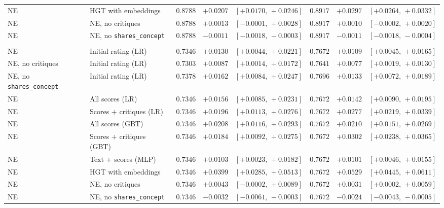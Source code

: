 \begin{table}[t]
\begin{tabular}{@{}llrrrrrr@{}}
NE & HGT with embeddings & $0.8788$ & $+0.0207$ & $[+0.0170,\,+0.0246]$ & $0.8917$ & $+0.0297$ & $[+0.0264,\,+0.0332]$ \\
NE & NE, no critiques & $0.8788$ & $+0.0013$ & $[-0.0001,\,+0.0028]$ & $0.8917$ & $+0.0010$ & $[-0.0002,\,+0.0020]$ \\
NE & NE, no \texttt{shares\_concept} & $0.8788$ & $-0.0011$ & $[-0.0018,\,-0.0003]$ & $0.8917$ & $-0.0011$ & $[-0.0018,\,-0.0004]$ \\
\addlinespace
\multicolumn{8}{l}{\emph{Borderline papers}} \\
NE & Initial rating (LR) & $0.7346$ & $+0.0130$ & $[+0.0044,\,+0.0221]$ & $0.7672$ & $+0.0109$ & $[+0.0045,\,+0.0165]$ \\
NE, no critiques & Initial rating (LR) & $0.7303$ & $+0.0087$ & $[+0.0014,\,+0.0172]$ & $0.7641$ & $+0.0077$ & $[+0.0019,\,+0.0130]$ \\
NE, no \texttt{shares\_concept} & Initial rating (LR) & $0.7378$ & $+0.0162$ & $[+0.0084,\,+0.0247]$ & $0.7696$ & $+0.0133$ & $[+0.0072,\,+0.0189]$ \\
NE & All scores (LR) & $0.7346$ & $+0.0156$ & $[+0.0085,\,+0.0231]$ & $0.7672$ & $+0.0142$ & $[+0.0090,\,+0.0195]$ \\
NE & Scores + critiques (LR) & $0.7346$ & $+0.0196$ & $[+0.0113,\,+0.0276]$ & $0.7672$ & $+0.0277$ & $[+0.0219,\,+0.0339]$ \\
NE & All scores (GBT) & $0.7346$ & $+0.0208$ & $[+0.0116,\,+0.0293]$ & $0.7672$ & $+0.0210$ & $[+0.0151,\,+0.0269]$ \\
NE & Scores + critiques (GBT) & $0.7346$ & $+0.0184$ & $[+0.0092,\,+0.0275]$ & $0.7672$ & $+0.0302$ & $[+0.0238,\,+0.0365]$ \\
NE & Text + scores (MLP) & $0.7346$ & $+0.0103$ & $[+0.0023,\,+0.0182]$ & $0.7672$ & $+0.0101$ & $[+0.0046,\,+0.0155]$ \\
NE & HGT with embeddings & $0.7346$ & $+0.0399$ & $[+0.0285,\,+0.0513]$ & $0.7672$ & $+0.0529$ & $[+0.0445,\,+0.0611]$ \\
NE & NE, no critiques & $0.7346$ & $+0.0043$ & $[-0.0002,\,+0.0089]$ & $0.7672$ & $+0.0031$ & $[+0.0002,\,+0.0059]$ \\
NE & NE, no \texttt{shares\_concept} & $0.7346$ & $-0.0032$ & $[-0.0061,\,-0.0003]$ & $0.7672$ & $-0.0024$ & $[-0.0043,\,-0.0005]$ \\
\bottomrule
\end{tabular}
\end{table}
